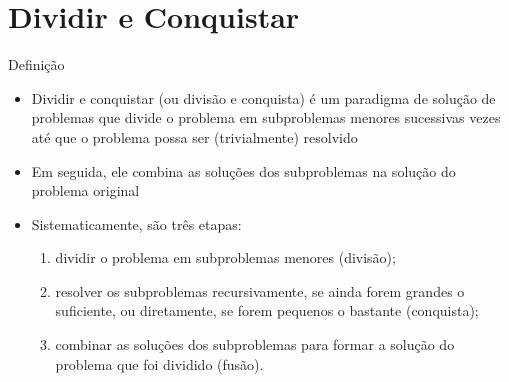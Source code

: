 \section{Dividir e Conquistar}

\begin{frame}[fragile]{Definição}

    \begin{itemize}
        \item Dividir e conquistar (ou divisão e conquista) é um paradigma de solução de problemas
            que divide o problema em subproblemas menores sucessivas vezes até que o problema
            possa ser (trivialmente) resolvido

        \item Em seguida, ele combina as soluções dos subproblemas na solução do problema original

        \item Sistematicamente, são três etapas:

        \begin{enumerate}
            \item dividir o problema em subproblemas menores (divisão);

            \item resolver os subproblemas recursivamente, se ainda forem grandes o suficiente,
                ou diretamente, se forem pequenos o bastante (conquista);

            \item combinar as soluções dos subproblemas para formar a solução do problema
                que foi dividido (fusão).
        \end{enumerate}

    \end{itemize}

\end{frame}

